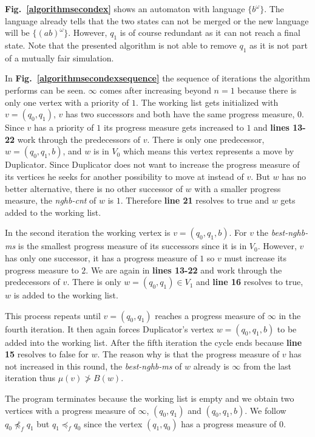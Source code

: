 \documentclass[12pt,oneside,bibliography=totoc,abstracton]{scrartcl}
\newcommand{\figref}[1]{\textbf{Fig.~\ref{#1}}}
\begin{document}
\figref{algorithmsecondex} shows an automaton with language $\{b^{\omega}\}$.
The language already tells that the two states can not be merged or the new language
will be $\{(ab)^{\omega}\}$. However, $q_1$ is of course redundant as it can not reach a final state.
Note that the presented algorithm is not able to remove $q_1$ as it is not part of a mutually fair simulation.

In \figref{algorithmsecondexsequence} the sequence of iterations the algorithm performs can be seen.
$\infty$ comes after increasing beyond $n = 1$ because there is only one vertex with a priority of $1$.
The working list gets initialized with $v = (q_0, q_1)$, $v$ has two successors and both have
the same progress measure, $0$. Since $v$ has a priority of $1$ its progress measure gets increased to
$1$ and \textbf{lines 13-22} work through the predecessors of $v$. There is only one predecessor, $w = (q_0, q_1, b)$,
and $w$ is in $V_0$ which means this vertex represents a move by Duplicator. Since Duplicator does not want
to increase the progress measure of its vertices he seeks for another possibility to move at instead of $v$. But $w$
has no better alternative, there is no other successor of $w$ with a smaller progress measure, the \textit{nghb-cnt}
of $w$ is $1$. Therefore \textbf{line 21} resolves to true and $w$ gets added to the working list.

In the second iteration the working vertex is $v = (q_0, q_1, b)$. For $v$ the \textit{best-nghb-ms} is the
smallest progress measure of its successors since it is in $V_0$. However, $v$ has only one successor, it has
a progress measure of $1$ so $v$ must increase its progress measure to $2$. We are again in \textbf{lines 13-22} and
work through the predecessors of $v$. There is only $w = (q_0, q_1) \in V_1$ and \textbf{line 16} resolves to true,
$w$ is added to the working list.

This process repeats until $v = (q_0, q_1)$ reaches a progress measure of $\infty$ in the fourth iteration.
It then again forces Duplicator's vertex $w = (q_0, q_1, b)$ to be added into the working list.
After the fifth iteration the cycle ends because \textbf{line 15} resolves to false for $w$.
The reason why is that the progress measure of $v$ has not increased in this round,
the \textit{best-nghb-ms} of $w$ already is $\infty$ from the last iteration thus $\mu(v) \not> B(w)$.

The program terminates because the working list is empty and we obtain two vertices with a progress
measure of $\infty$, $(q_0, q_1)$ and $(q_0, q_1, b)$. We follow $q_0 \not\preceq_f q_1$ but
$q_1 \preceq_f q_0$ since the vertex $(q_1, q_0)$ has a progress measure of $0$.
\end{document}
